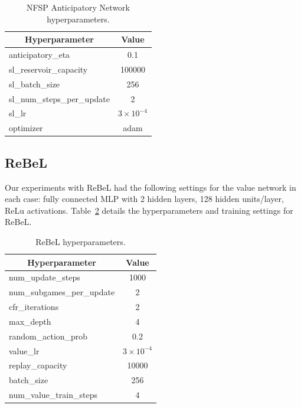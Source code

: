 \begin{table}[htbp]
    \caption{NFSP Anticipatory Network hyperparameters.}
    \begin{center}
        \begin{tabular}{lc}
        \hline
            \multicolumn{1}{c}{Hyperparameter} & \multicolumn{1}{c}{Value} \\ \hline
            anticipatory\_eta & 0.1 \\
            sl\_reservoir\_capacity & 100000 \\
            sl\_batch\_size & 256 \\
            sl\_num\_steps\_per\_update & 2 \\
            sl\_lr & $3\times10^{-4}$ \\
            optimizer & adam \\
            \hline
        \end{tabular}
    \end{center}
    \label{tab:nfsp_hyperparams}
\end{table}

\subsection{ReBeL}
Our experiments with ReBeL had the following settings for the value network in each case: fully connected MLP with 2 hidden layers, 128 hidden units/layer, ReLu activations. Table~\ref{tab:rebel_hyperparams} details the hyperparameters and training settings for ReBeL.

\begin{table}[htbp]
    \caption{ReBeL hyperparameters.}
    \begin{center}
        \begin{tabular}{lc}
        \hline
            \multicolumn{1}{c}{Hyperparameter} & \multicolumn{1}{c}{Value} \\ \hline
            num\_update\_steps & 1000 \\
            num\_subgames\_per\_update & 2 \\
            cfr\_iterations & 2 \\
            max\_depth & 4 \\
            random\_action\_prob & 0.2 \\
            value\_lr & $3\times10^{-4}$ \\
            replay\_capacity & 10000 \\
            batch\_size & 256 \\
            num\_value\_train\_steps & 4 \\
            \hline
        \end{tabular}
    \end{center}
    \label{tab:rebel_hyperparams}
\end{table}